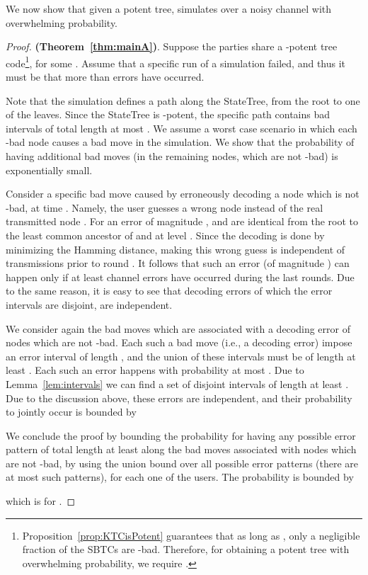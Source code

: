 \documentclass[ letterpaper, 11pt]{article}
\newcommand{\statetree}{{\textsf{StateTree}}\xspace}
\newcommand{\potent}{potent\xspace}
\newcommand{\KTC}{\textsf{SBTC}\xspace}
\begin{document}
We now show that given a \potent tree,
  simulates  over a noisy channel with overwhelming probability.


\begin{proof} \textbf{(Theorem~\ref{thm:mainA})}.
Suppose the parties share a -\potent tree code\footnote{
    Proposition~\ref{prop:KTCisPotent} guarantees  that
    as long as ,
    only a negligible fraction of the \KTC{}s are -bad. Therefore,
     for obtaining a \potent tree with overwhelming probability, we require .},
for some .
Assume that a specific run of a simulation failed, and thus
it must be that more than  errors have occurred.

Note that the simulation defines a path along the \statetree, from the root
to one of the leaves. Since the \statetree is -\potent, the
specific path contains bad intervals of total length
at most . We assume a worst case scenario in which
each -bad node causes a bad move in the simulation.
We show that
the probability of having  additional  bad moves
(in the remaining nodes, which are not -bad)
is exponentially small.

Consider a specific bad move caused by erroneously decoding a node which is not -bad,
at time . Namely, the user guesses a wrong node  instead of the real transmitted node .
For an error of magnitude ,  and  are identical from the root
to the least common ancestor of  and  at level .
Since the decoding is done by minimizing the Hamming distance,
making this wrong guess is independent of transmissions prior to round .
It follows that such an error (of magnitude ) can happen only if at least 
channel errors have occurred during the last  rounds.
Due to the same reason, it is easy to see that decoding errors of which the
error intervals are disjoint, are independent.

We consider again the bad moves which are associated with
a decoding error of  nodes which are not -bad. Each such a bad move (i.e., a decoding error)
impose an error interval of length , and the union of these intervals must be
of length at least .
Each such an error happens with probability at most
.
Due to Lemma~\ref{lem:intervals} we can find a set of disjoint intervals
of length at least . Due to the discussion above, these errors are independent, and their
probability to jointly occur is bounded by




We conclude the proof by bounding the probability
for having any possible error pattern of total length at least 
along the bad moves associated with nodes which are not -bad,
by using the union bound
over all possible error patterns (there are
at most  such patterns),
for each one of the users. The probability is bounded by

which is  for  .
\end{proof}
\end{document}
